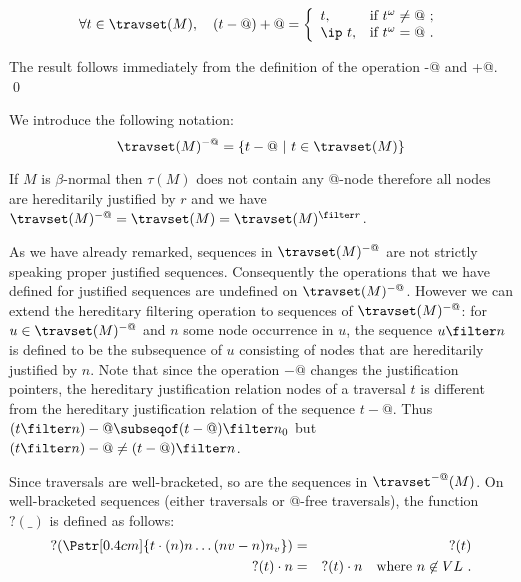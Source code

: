 \begin{lemma} \label{lem:minus_at_plus_at}
$$\forall t \in \travset(M), \quad (t-@)+@ = \left\{
            \begin{array}{ll}
              t, & \hbox{if $t^\omega \neq @$\ ;} \\
              \ip\ t, & \hbox{if $t^\omega = @$\ .}
            \end{array}
          \right.
$$
\end{lemma}
\proof
The result follows immediately from the definition of the operation -@ and +@.
\qed
\bigskip

We introduce the following notation:
$$
\travset(M)^{-@} = \{ t - @ \ | \  t \in \travset(M) \}
$$

\begin{remark}
If $M$ is $\beta$-normal then $\tau(M)$ does not contain any
@-node therefore all nodes are hereditarily justified by $r$ and we
have $\travset(M)^{-@} = \travset(M) = \travset(M)^{\filter
r }$.
\end{remark}



As we have already remarked, sequences in $\travset(M)^{-@}$ are not strictly speaking proper justified sequences. Consequently the operations that we have defined for
justified sequences are undefined on $\travset(M)^{-@}$.
However we can extend the hereditary filtering operation to sequences of $\travset(M)^{-@}$:
for $u\in \travset(M)^{-@}$ and $n$ some node occurrence in $u$, the sequence $u\filter n$ is defined
to be the subsequence of $u$ consisting of nodes that are hereditarily justified by $n$.
Note that since the operation $-@$ changes the justification pointers, the hereditary justification relation nodes of a traversal $t$ is different from the hereditary justification relation of the sequence $t-@$. Thus
$(t\filter n)-@ \subseqof (t-@) \filter n_0$ but $(t\filter n)-@ \neq (t-@) \filter n$.



Since traversals are well-bracketed, so are the sequences in $\travset^{-@}(M)$.
On well-bracketed sequences (either traversals or @-free traversals),
the function $?(\_)$ is defined as follows:
\begin{eqnarray*}
  ?(\Pstr[0.4cm]{t \cdot (n){n} \ldots (nv-n){n_v} }  ) &=& ?(t) \\
    ?(t) \cdot n &=& ?(t)\cdot n    \quad \mbox{where $n\not\in VL$} \ .
\end{eqnarray*}

